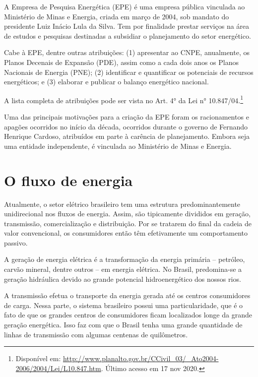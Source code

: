 \documentclass[grad,numbers]{coppe}
\begin{document}
  A Empresa de Pesquisa Energética (EPE) é uma empresa pública vinculada ao Ministério de Minas e Energia, criada em março de 2004, sob mandato do presidente Luiz Inácio Lula da Silva. Tem por finalidade prestar serviços na área de estudos e pesquisas destinadas a subsidiar o planejamento do setor energético.

  Cabe à EPE, dentre outras atribuições: (1) apresentar ao CNPE, anualmente, os Planos Decenais de Expansão (PDE), assim como a cada dois anos os Planos Nacionais de Energia (PNE); (2) identificar e quantificar os potenciais de recursos energéticos; e (3) elaborar e publicar o balanço energético nacional.

  A lista completa de atribuições pode ser vista no Art. 4° da Lei n° 10.847/04.\footnote{Disponível em: \url{http://www.planalto.gov.br/CCivil_03/_Ato2004-2006/2004/Lei/L10.847.htm}. Último acesso em 17 nov 2020.}

  Uma das principais motivações para a criação da EPE foram os racionamentos e apagões ocorridos no início da década, ocorridos durante o governo de Fernando Henrique Cardoso, atribuídos em parte à carência de planejamento. Embora seja uma entidade independente, é vinculada ao Ministério de Minas e Energia.

  \hypertarget{o-fluxo-de-energia}{%
  \section{O fluxo de energia}\label{o-fluxo-de-energia}}

  Atualmente, o setor elétrico brasileiro tem uma estrutura predominantemente unidirecional nos fluxos de energia. Assim, são tipicamente divididos em geração, transmissão, comercialização e distribuição. Por se tratarem do final da cadeia de valor convencional, os consumidores então têm efetivamente um comportamento passivo.

  A geração de energia elétrica é a transformação da energia primária -- petróleo, carvão mineral, dentre outros -- em energia elétrica. No Brasil, predomina-se a geração hidráulica devido ao grande potencial hidroenergético dos nossos rios.

  A transmissão efetua o transporte da energia gerada até os centros consumidores de carga. Nessa parte, o sistema brasileiro possui uma particularidade, que é o fato de que os grandes centros de consumidores ficam localizados longe da grande geração energética. Isso faz com que o Brasil tenha uma grande quantidade de linhas de transmissão com algumas centenas de quilômetros.
\end{document}

